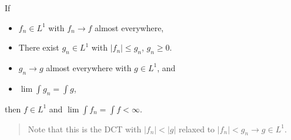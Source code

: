 \begin{theorem}

If

\begin{itemize}
\tightlist
\item
  \(f_n \in L^1\) with \(f_n \to f\) almost everywhere,
\item
  There exist \(g_n \in L^1\) with
  \({\left\lvert {f_n} \right\rvert} \leq g_n\), \(g_n \geq 0\).
\item
  \(g_n\to g\) almost everywhere with \(g\in L^1\), and
\item
  \(\lim \int g_n = \int g\),
\end{itemize}

then \(f\in L^1\) and \(\lim \int f_n = \int f < \infty\).

\begin{quote}
Note that this is the DCT with
\({\left\lvert {f_n} \right\rvert} < {\left\lvert {g} \right\rvert}\)
relaxed to \({\left\lvert {f_n} \right\rvert} < g_n \to g\in L^1\).
\end{quote}

\end{theorem}

